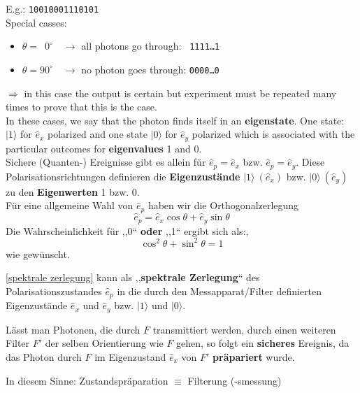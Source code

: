 E.g.: \texttt{10010001110101}\\[5pt]
Special casses:
\begin{itemize}
	\item $ \theta = \phantom{0}0^\circ \quad \to $ all photons go through: $\phantom{1}$\texttt{1111\dots1}
	\item $ \theta = 90^\circ \quad \to $ no photon goes through: \texttt{0000\dots0}
\end{itemize}
$ \Rightarrow $ in this case the output is certain but experiment must be repeated many times to prove that this is the case.\\[10pt]
In these cases, we say that the photon finds itself in an \textbf{eigenstate}. One state: $ |1\rangle $ for $ \hat{e}_x $ polarized and one state $ |0\rangle $ for $ \hat{e}_y $ polarized which is associated with the particular outcomes for \textbf{eigenvalues} 1 and 0.\\[10pt]


\noindent
Sichere (Quanten-) Ereignisse gibt es allein für $ \hat{e}_p = \hat{e}_x $ bzw. $ \hat{e}_p = \hat{e}_y $. Diese Polarisationsrichtungen definieren die \textbf{Eigenzustände} $ |1\rangle \ (\hat{e}_x) $ bzw. $ |0\rangle \ (\hat{e}_y) $ zu den \textbf{Eigenwerten} 1 bzw. 0.\\[10pt]
Für eine allgemeine Wahl von $ \hat{e}_p $ haben wir die Orthogonalzerlegung 
\begin{equation}
\hat{e}_p = \hat{e}_x \cos\theta + \hat{e}_y \sin 
\theta
\label{spektrale zerlegung}
\end{equation}
Die Wahrscheinlichkeit für ,,0`` \textbf{oder} ,,1`` ergibt sich als:,
\begin{equation}
\cos^2 \theta + \sin^2 \theta = 1
\label{cos2sin2}
\end{equation}
wie gewünscht.\par
\eqref{spektrale zerlegung} kann als ,,\textbf{spektrale Zerlegung}`` des Polarisationszustandes $ \hat{e}_p $ in die durch den Messapparat/Filter definierten Eigenzustände $ \hat{e}_x $ und $ \hat{e}_y $ bzw. $ |1\rangle $ und $ |0\rangle $.\par
Lässt man Photonen, die durch $ F $ transmittiert werden, durch einen weiteren Filter $ F' $ der selben Orientierung wie $ F $ gehen, so folgt ein \textbf{sicheres} Ereignis, da das Photon durch $ F $ im Eigenzustand $ \hat{e}_x $ von $ F' $ \textbf{präpariert} wurde.\par
In diesem Sinne: Zustandspräparation $ \equiv $ Filterung (-smessung)

